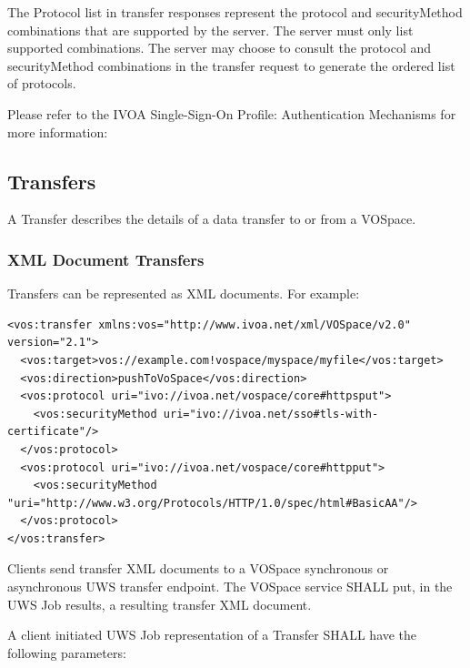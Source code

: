 \documentclass[11pt,a4paper]{ivoa}
\begin{document}
The Protocol list in transfer responses represent the protocol and securityMethod combinations that are supported by the server.  The server must only list supported combinations.  The server may choose to consult the protocol and securityMethod combinations in the transfer request to generate the ordered list of protocols.

Please refer to the IVOA Single-Sign-On Profile: Authentication Mechanisms for more information: \citep{std:SSOAUTH2}

\subsection{Transfers}
\label{subsec:transfers}
A Transfer describes the details of a data transfer to or from a VOSpace.

\subsubsection{XML Document Transfers}
\label{subsubsec:xml document transfers}

Transfers can be represented as XML documents.  For example:

\begin{lstlisting}
<vos:transfer xmlns:vos="http://www.ivoa.net/xml/VOSpace/v2.0" version="2.1">
  <vos:target>vos://example.com!vospace/myspace/myfile</vos:target>
  <vos:direction>pushToVoSpace</vos:direction>
  <vos:protocol uri="ivo://ivoa.net/vospace/core#httpsput">
    <vos:securityMethod uri="ivo://ivoa.net/sso#tls-with-certificate"/>
  </vos:protocol>
  <vos:protocol uri="ivo://ivoa.net/vospace/core#httpput">
    <vos:securityMethod "uri="http://www.w3.org/Protocols/HTTP/1.0/spec/html#BasicAA"/>
  </vos:protocol>
</vos:transfer>
\end{lstlisting}

Clients send transfer XML documents to a VOSpace synchronous or asynchronous UWS transfer endpoint.  The VOSpace service SHALL put, in the UWS Job results, a resulting transfer XML document.

A client initiated UWS Job representation of a Transfer SHALL have the following parameters:
\end{document}
